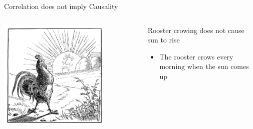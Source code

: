 \documentclass[aspectratio=169,t,11pt,table]{beamer}
\begin{document}
\begin{frame}{Correlation does not imply Causality}
  \begin{columns}[T]
    \begin{column}{.6\textwidth}\vspace*{-\bigskipamount}
      \begin{center}
        \includegraphics[width = 0.75\textwidth]{figures/rooster_crowing_at_sun.jpg}
      \end{center}
    \end{column}
    \begin{column}{.4\textwidth}
      Rooster crowing does not cause sun to rise
      \begin{itemize}
        \item The rooster crows every morning when the sun comes up
      \end{itemize}
    \end{column}
  \end{columns}
\end{frame}

% 
\end{document}
